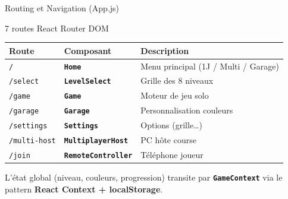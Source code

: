 \documentclass[aspectratio=169,12pt]{beamer}
\newcommand{\tech}[1]{\textcolor{mycyan}{\textbf{\texttt{#1}}}}
\begin{document}
\begin{frame}{Routing et Navigation (App.js)}
  \begin{block}{7 routes React Router DOM}
    \vspace{0.2cm}
    \begin{tabular}{lll}
      \toprule
      \textcolor{mycyan}{Route} & \textcolor{myyellow}{Composant} & \textcolor{mylightslate}{Description}\\
      \midrule
      \texttt{/} & \tech{Home} & Menu principal (1J / Multi / Garage)\\
      \texttt{/select} & \tech{LevelSelect} & Grille des 8 niveaux\\
      \texttt{/game} & \tech{Game} & Moteur de jeu solo\\
      \texttt{/garage} & \tech{Garage} & Personnalisation couleurs\\
      \texttt{/settings} & \tech{Settings} & Options (grille\ldots)\\
      \texttt{/multi-host} & \tech{MultiplayerHost} & PC h\^ote course\\
      \texttt{/join} & \tech{RemoteController} & T\'el\'ephone joueur\\
      \bottomrule
    \end{tabular}
  \end{block}
  \vspace{0.3cm}
  L'\'etat global (niveau, couleurs, progression) transite par \tech{GameContext}
  via le pattern \textbf{React Context + localStorage}.
\end{frame}
\end{document}
